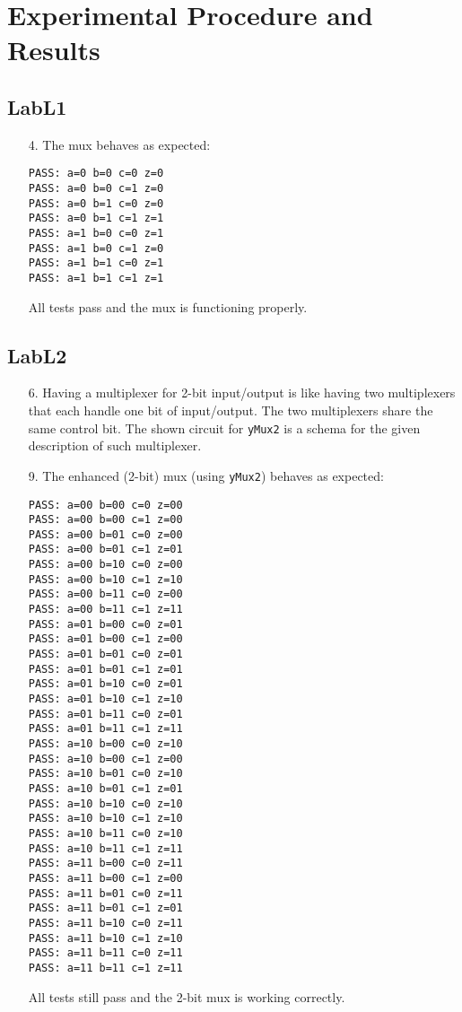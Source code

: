 \documentclass{article}
\begin{document}

\section{Experimental Procedure and Results}

\subsection{LabL1}
\begin{enumerate}
\item[4. ] The mux behaves as expected:
\begin{verbatim}
PASS: a=0 b=0 c=0 z=0
PASS: a=0 b=0 c=1 z=0
PASS: a=0 b=1 c=0 z=0
PASS: a=0 b=1 c=1 z=1
PASS: a=1 b=0 c=0 z=1
PASS: a=1 b=0 c=1 z=0
PASS: a=1 b=1 c=0 z=1
PASS: a=1 b=1 c=1 z=1
\end{verbatim}

  All tests pass and the mux is functioning properly.

\end{enumerate}

\subsection{LabL2}
\begin{enumerate}
\item[6. ] Having a multiplexer for 2-bit input/output is like having two multiplexers that each handle one bit of input/output. The two multiplexers share the same control bit. The shown circuit for \verb$yMux2$ is a schema for the given description of such multiplexer.

\item[9. ] The enhanced (2-bit) mux (using \verb$yMux2$) behaves as expected:
\begin{verbatim}
PASS: a=00 b=00 c=0 z=00
PASS: a=00 b=00 c=1 z=00
PASS: a=00 b=01 c=0 z=00
PASS: a=00 b=01 c=1 z=01
PASS: a=00 b=10 c=0 z=00
PASS: a=00 b=10 c=1 z=10
PASS: a=00 b=11 c=0 z=00
PASS: a=00 b=11 c=1 z=11
PASS: a=01 b=00 c=0 z=01
PASS: a=01 b=00 c=1 z=00
PASS: a=01 b=01 c=0 z=01
PASS: a=01 b=01 c=1 z=01
PASS: a=01 b=10 c=0 z=01
PASS: a=01 b=10 c=1 z=10
PASS: a=01 b=11 c=0 z=01
PASS: a=01 b=11 c=1 z=11
PASS: a=10 b=00 c=0 z=10
PASS: a=10 b=00 c=1 z=00
PASS: a=10 b=01 c=0 z=10
PASS: a=10 b=01 c=1 z=01
PASS: a=10 b=10 c=0 z=10
PASS: a=10 b=10 c=1 z=10
PASS: a=10 b=11 c=0 z=10
PASS: a=10 b=11 c=1 z=11
PASS: a=11 b=00 c=0 z=11
PASS: a=11 b=00 c=1 z=00
PASS: a=11 b=01 c=0 z=11
PASS: a=11 b=01 c=1 z=01
PASS: a=11 b=10 c=0 z=11
PASS: a=11 b=10 c=1 z=10
PASS: a=11 b=11 c=0 z=11
PASS: a=11 b=11 c=1 z=11
\end{verbatim}

  All tests still pass and the 2-bit mux is working correctly.

\end{enumerate}
\end{document}
